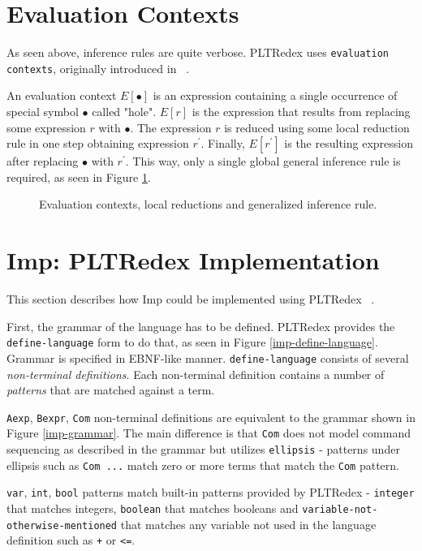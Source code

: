 \section{Evaluation Contexts}
\label{02-evaluation-context}
As seen above, inference rules are quite verbose. PLTRedex uses \texttt{evaluation contexts}, originally introduced in ~\cite{felleisen1992revised}.

An evaluation context $E[\bullet]$ is an expression containing a single occurrence of special symbol $\bullet$ called "hole". $E[r]$ is the expression that results from replacing some expression $r$ with $\bullet$. The expression $r$ is reduced using some local reduction rule in one step obtaining expression $r^\prime$. Finally, $E[r^\prime]$ is the resulting expression after replacing $\bullet$ with $r^\prime$. This way, only a single global general inference rule is required, as seen in Figure \ref{infer-evaluation}.

\begin{figure}[h]

\caption{Evaluation contexts, local reductions and generalized inference rule.}
\label{infer-evaluation}
\end{figure}

\section{Imp: PLTRedex Implementation}
\label{02-pltredex}

This section describes how Imp could be implemented using PLTRedex ~\cite{redexreference}.

First, the grammar of the language has to be defined. PLTRedex provides the \texttt{define-language} form to do that, as seen in Figure \ref{imp-define-language}. Grammar is specified in EBNF-like manner. \texttt{define-language} consists of several \textit{non-terminal definitions}. Each non-terminal definition contains a number of \textit{patterns} that are matched against a term.

\texttt{Aexp}, \texttt{Bexpr}, \texttt{Com} non-terminal definitions are equivalent to the grammar shown in Figure \ref{imp-grammar}. The main difference is that \texttt{Com} does not model command sequencing as described in the grammar but utilizes \texttt{ellipsis} - patterns under ellipsis such as \texttt{Com ...} match zero or more terms that match the \texttt{Com} pattern.

\texttt{var}, \texttt{int}, \texttt{bool} patterns match built-in patterns provided by PLTRedex - \texttt{integer} that matches integers, \texttt{boolean} that matches booleans and \texttt{variable-not-otherwise-mentioned} that matches any variable not used in the language definition such as \texttt{+} or \texttt{<=}.

